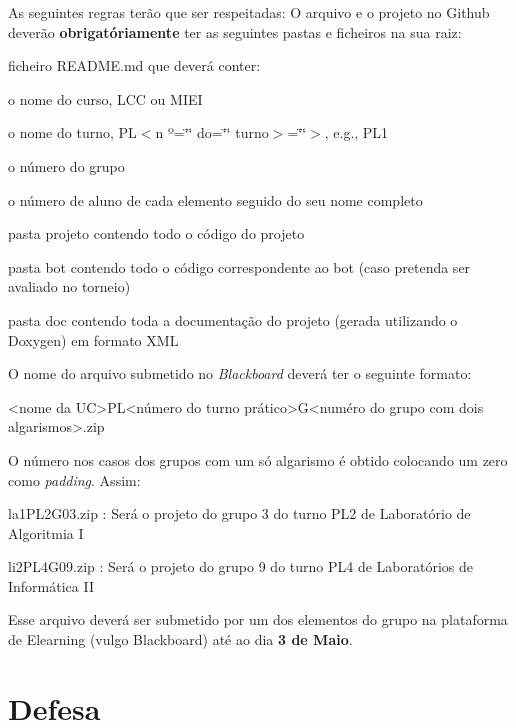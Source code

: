 As seguintes regras terão que ser respeitadas\+: O arquivo e o projeto no Github deverão {\bfseries obrigatóriamente} ter as seguintes pastas e ficheiros na sua raiz\+:


\begin{DoxyItemize}
\item ficheiro {\ttfamily R\+E\+A\+D\+M\+E.\+md} que deverá conter\+:
\begin{DoxyItemize}
\item o nome do curso, L\+CC ou M\+I\+EI
\item o nome do turno, PL$<$n º=\char`\"{}\char`\"{} do=\char`\"{}\char`\"{} turno$>$=\char`\"{}\char`\"{}$>$, e.\+g., P\+L1
\item o número do grupo
\item o número de aluno de cada elemento seguido do seu nome completo
\end{DoxyItemize}
\item pasta {\ttfamily projeto} contendo todo o código do projeto
\item pasta {\ttfamily bot} contendo todo o código correspondente ao bot (caso pretenda ser avaliado no torneio)
\item pasta {\ttfamily doc} contendo toda a documentação do projeto (gerada utilizando o {\ttfamily Doxygen}) em formato {\ttfamily X\+ML}
\end{DoxyItemize}

O nome do arquivo submetido no {\itshape Blackboard} deverá ter o seguinte formato\+: \begin{DoxyVerb}<nome da UC>PL<número do turno prático>G<numéro do grupo com dois algarismos>.zip
\end{DoxyVerb}


O número nos casos dos grupos com um só algarismo é obtido colocando um zero como {\itshape padding}. Assim\+:

{\ttfamily la1\+P\+L2\+G03.\+zip} \+: Será o projeto do grupo 3 do turno P\+L2 de Laboratório de Algoritmia I

{\ttfamily li2\+P\+L4\+G09.\+zip} \+: Será o projeto do grupo 9 do turno P\+L4 de Laboratórios de Informática II

Esse arquivo deverá ser submetido por um dos elementos do grupo na plataforma de Elearning (vulgo Blackboard) até ao dia {\bfseries 3 de Maio}.

\section*{Defesa}

